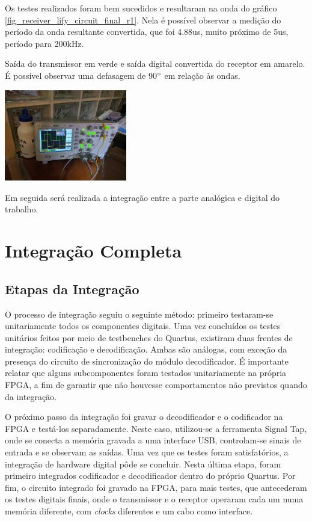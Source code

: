 	Os testes realizados foram bem sucedidos e resultaram na onda do gráfico \ref{fig_receiver_lify_circuit_final_r1}. Nela é possível observar a medição do período da onda resultante convertida, que foi 4.88us, muito próximo de 5us, período para 200kHz.

	\begin{chart}[h!]
		\caption{\label{fig_receiver_lify_circuit_final_r1}Saída do transmissor em verde e saída digital convertida do receptor em amarelo. É possível observar uma defasagem de 90$\degree$ em relação às ondas.}
		\centering
		\includegraphics[width=0.4\textwidth, trim={36cm 30cm 60cm 40cm}, clip]{circuits/photos/TXRX_final_fixed.jpg}
	\end{chart}

	Em seguida será realizada a integração entre a parte analógica e digital do trabalho.

	\section{Integração Completa}

	\subsection{Etapas da Integração}
	O processo de integração seguiu o seguinte método: primeiro testaram-se unitariamente todos os componentes digitais. Uma vez concluídos os testes unitários feitos por meio de testbenches do Quartus, existiram duas frentes de integração: codificação e decodificação. Ambas são análogas, com exceção da presença do circuito de sincronização do módulo decodificador. É importante relatar que alguns subcomponentes foram testados unitariamente na própria FPGA, a fim de garantir que não houvesse comportamentos não previstos quando da integração.

	O próximo passo da integração foi gravar o decodificador e o codificador na FPGA e testá-los separadamente. Neste caso, utilizou-se a ferramenta Signal Tap, onde se conecta a memória gravada a uma interface USB, controlam-se sinais de entrada e se observam as saídas. Uma vez que os testes foram satisfatórios, a integração de hardware digital pôde se concluir. Nesta última etapa, foram primeiro integrados codificador e decodificador dentro do próprio Quartus. Por fim, o circuito integrado foi gravado na FPGA, para mais testes, que antecederam os testes digitais finais, onde o transmissor e o receptor operaram cada um numa memória diferente, com \textit{clocks} diferentes e um cabo como interface.

